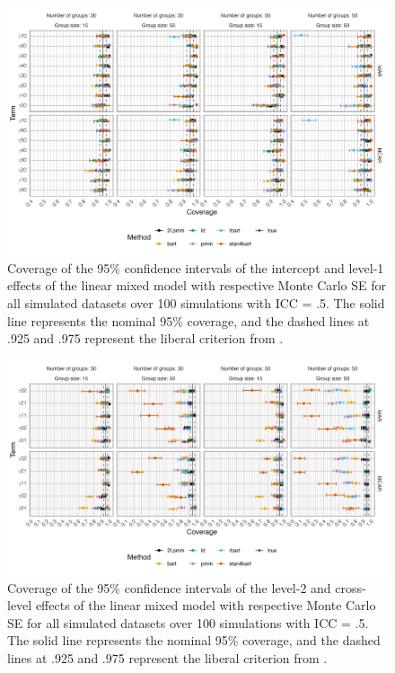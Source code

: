 \documentclass[3p,12pt,a4paper]{elsarticle}
\begin{document}
\begin{figure}[H]
    \centering
    \includegraphics[width=1\textwidth]{coveragelevel1.png}
    \caption{Coverage of the 95\% confidence intervals of the intercept and level-1 effects of the linear mixed model with respective Monte Carlo SE for all simulated datasets over 100 simulations with ICC = .5. The solid line represents the nominal 95\% coverage, and the dashed lines at .925 and .975 represent the liberal criterion from \citet{bradley1978}.}
    \label{fig:coveragelevel1}
\end{figure}

\begin{figure}[H]
    \centering
    \includegraphics[width=1\textwidth]{coveragelevel2.png}
    \caption{Coverage of the 95\% confidence intervals of the level-2 and cross-level effects of the linear mixed model with respective Monte Carlo SE for all simulated datasets over 100 simulations with ICC = .5. The solid line represents the nominal 95\% coverage, and the dashed lines at .925 and .975 represent the liberal criterion from \citet{bradley1978}.}
    \label{fig:coveragelevel2}
\end{figure}
\end{document}
